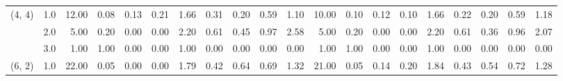 \begin{tabular}{llrrrrrrrrrrrrrrrrrr}
(4, 4) & 1.0 &              12.00 &                     0.08 &                                 0.13 &                             0.21 &                           1.66 &                                               0.31 &                                            0.20 &                                            0.59 &                                        1.10 &              10.00 &                     0.10 &                                 0.12 &                             0.10 &                           1.66 &                                               0.22 &                                            0.20 &                                            0.59 &                                        1.18 \\
       & 2.0 &               5.00 &                     0.20 &                                 0.00 &                             0.00 &                           2.20 &                                               0.61 &                                            0.45 &                                            0.97 &                                        2.58 &               5.00 &                     0.20 &                                 0.00 &                             0.00 &                           2.20 &                                               0.61 &                                            0.36 &                                            0.96 &                                        2.07 \\
       & 3.0 &               1.00 &                     1.00 &                                 0.00 &                             0.00 &                           1.00 &                                               0.00 &                                            0.00 &                                            0.00 &                                        0.00 &               1.00 &                     1.00 &                                 0.00 &                             0.00 &                           1.00 &                                               0.00 &                                            0.00 &                                            0.00 &                                        0.00 \\
(6, 2) & 1.0 &              22.00 &                     0.05 &                                 0.00 &                             0.00 &                           1.79 &                                               0.42 &                                            0.64 &                                            0.69 &                                        1.32 &              21.00 &                     0.05 &                                 0.14 &                             0.20 &                           1.84 &                                               0.43 &                                            0.54 &                                            0.72 &                                        1.28 \\

\end{tabular}
